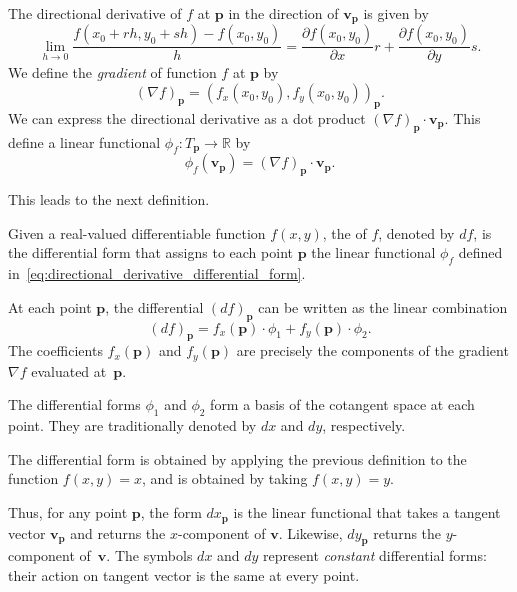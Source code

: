The directional derivative of $f$ at $\mathbf{p}$ in the direction of $\mathbf{v}_\mathbf{p}$ is given by
$$
\lim_{h\rightarrow 0} \frac{f(x_0+rh, y_0+sh) - f(x_0,y_0)}{h} = \frac{\partial f(x_0,y_0)}{\partial x} r + \frac{\partial f (x_0,y_0)}{\partial y} s .
$$
We define the {\em gradient} of function $f$ at $\mathbf{p}$ by 
$$(\nabla f)_\mathbf{p} = (f_x(x_0,y_0), f_y(x_0,y_0))_\mathbf{p}.$$
We can express the directional derivative as a dot product
$(\nabla f)_\mathbf{p} \cdot \mathbf{v}_\mathbf{p}$.
This define a linear functional $\phi_f : T_\mathbf{p} \rightarrow \mathbb{R}$ by
\begin{equation}
\phi_f(\mathbf{v}_\mathbf{p}) = (\nabla f)_\mathbf{p} \cdot \mathbf{v}_\mathbf{p}.
\label{eq:directional_derivative_differential_form}
\end{equation}

This leads to the next definition.


\begin{svgraybox}
	\begin{definition} 
Given a real-valued differentiable function $f(x,y)$, the  of $f$, denoted by $df$, is the differential form that assigns to each point $\mathbf{p}$ the linear functional $\phi_f$  defined in~\eqref{eq:directional_derivative_differential_form}.
	\end{definition}
\end{svgraybox}

At each point $\mathbf{p}$, the differential $(df)_\mathbf{p}$ can be written as the linear combination
$$
(df)_\mathbf{p} = f_x(\mathbf{p}) \cdot \phi_1 + f_y(\mathbf{p})\cdot \phi_2.
$$
The coefficients $f_x(\mathbf{p})$ and $f_y(\mathbf{p})$ are precisely the components of the gradient $\nabla f$ evaluated at~$\mathbf{p}$.

The differential forms $\phi_1$ and $\phi_2$ form a basis of the cotangent space at each point. They are traditionally denoted by $dx$ and $dy$, respectively.

\begin{svgraybox}
	\begin{definition}
The differential form  is obtained by applying the previous definition to the function $f(x,y)=x$, and  is obtained by taking $f(x,y)=y$.
	\end{definition}
\end{svgraybox}

Thus, for any point $\mathbf{p}$, the form $dx_\mathbf{p}$ is the linear functional that takes a tangent vector $\mathbf{v}_\mathbf{p}$ and returns the $x$-component of $\mathbf{v}$.  Likewise, $dy_\mathbf{p}$ returns the $y$-component of~$\mathbf{v}$.  The symbols $dx$ and $dy$ represent {\em constant} differential forms: their action on tangent vector is the same at every point.

